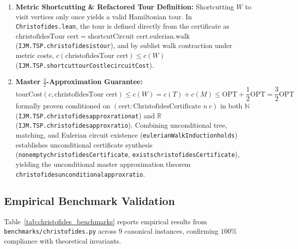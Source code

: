 \documentclass[11pt,a4paper]{article}
\renewcommand{\_}{\origunderscore\allowbreak}
\theoremstyle{plain}
\theoremstyle{definition}
\theoremstyle{remark}
\begin{document}
\begin{enumerate}
  \item \textbf{Metric Shortcutting \& Refactored Tour Definition:} Shortcutting $W$ to visit vertices only once yields a valid Hamiltonian tour. In \texttt{Christofides.lean}, the tour is defined directly from the certificate as $\text{christofidesTour } \text{cert} = \text{shortcutCircuit } \text{cert}.\text{eulerian}.\text{walk}$ (\texttt{IJM.TSP.christofides\_is\_tour}), and by sublist walk contraction under metric costs, $c(\text{christofidesTour } \text{cert}) \le c(W)$ (\texttt{IJM.TSP.shortcut\_tourCost\_le\_circuitCost}).
  \item \textbf{Master $\frac{3}{2}$-Approximation Guarantee:}
  \[
  \mathrm{tourCost}(c, \text{christofidesTour } \text{cert}) \le c(W) = c(T) + c(M) \le \mathrm{OPT} + \frac{1}{2}\mathrm{OPT} = \frac{3}{2}\mathrm{OPT}
  \]
  formally proven conditioned on $(\text{cert} : \text{ChristofidesCertificate } n\ c)$ in both $\mathbb{N}$ (\texttt{IJM.TSP.\allowbreak christofides\_approx\_ratio\_nat}) and $\mathbb{R}$ (\texttt{IJM.TSP.christofides\_approx\_ratio}). Combining unconditional tree, matching, and Eulerian circuit existence (\texttt{eulerianWalkInduction\_holds}) establishes unconditional certificate synthesis (\texttt{nonempty\_christofides\allowbreak Certificate}, \texttt{exists\_christofides\allowbreak Certificate}), yielding the unconditional master approximation theorem \texttt{christofides\_unconditional\_approx\_ratio}.
\end{enumerate}

\subsection{Empirical Benchmark Validation}
Table~\ref{tab:christofides_benchmarks} reports empirical results from \texttt{benchmarks/christofides.py} across 9 canonical instances, confirming $100\%$ compliance with theoretical invariants.
\end{document}
